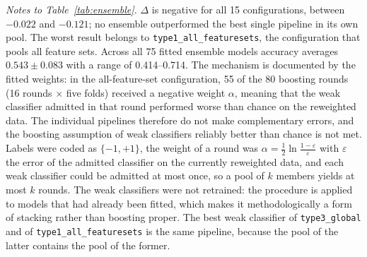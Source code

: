 \begin{table}[htbp]
\centering
\caption{Ensemble analysis: the 15 configurations of discrete, that is binary, AdaBoost \cite{Freund1997} applied to the stored prediction vectors of the 16 patient-level weak classifiers (four patient-level datasets $\times$ four pipelines). Each configuration was fitted on the five outer folds, giving 75 ensemble models. ACC $\varnothing$, mean accuracy of the configuration across the five folds; best weak classifier, the single pipeline in the configuration's pool with the highest mean accuracy, and its value; $\Delta$, the mean accuracy of the ensemble minus that of the best weak classifier. A negative $\Delta$ means the ensemble is worse than the best model it combines. The configuration name states which of the four patient-level datasets form its pool, each contributing all four pipelines: \texttt{type1} pools all four datasets (16 weak classifiers), \texttt{type2} a whole-thrombus dataset with its own centerline counterpart (8), \texttt{type3} a single dataset (4), \texttt{type4} two datasets that are not such a pair (8) and \texttt{type5} all datasets but one (12). \texttt{distrib.}\ abbreviates the distribution-based dataset and \emph{cent.} the centerline region of interest, as in Table~\ref{tab:cv-performance}. The two voxel-based datasets were excluded from every pool because their predictions are defined per voxel.}
\label{tab:ensemble}
\smallskip

\end{table}

\smallskip
{\footnotesize
\sloppy
\noindent
\textit{Notes to Table~\ref{tab:ensemble}.}
$\Delta$ is negative for all 15 configurations, between $-0.022$ and $-0.121$; no ensemble outperformed the best single pipeline in its own pool.
The worst result belongs to \texttt{type1\_\allowbreak all\_\allowbreak featuresets}, the configuration that pools all feature sets.
Across all 75 fitted ensemble models accuracy averages $0.543 \pm 0.083$ with a range of 0.414--0.714.
The mechanism is documented by the fitted weights: in the all-feature-set configuration, 55 of the 80 boosting rounds (16 rounds $\times$ five folds) received a negative weight $\alpha$, meaning that the weak classifier admitted in that round performed worse than chance on the reweighted data.
The individual pipelines therefore do not make complementary errors, and the boosting assumption of weak classifiers reliably better than chance is not met.
Labels were coded as $\{-1,+1\}$, the weight of a round was $\alpha = \tfrac{1}{2}\ln\frac{1-\varepsilon}{\varepsilon}$ with $\varepsilon$ the error of the admitted classifier on the currently reweighted data, and each weak classifier could be admitted at most once, so a pool of $k$ members yields at most $k$ rounds.
The weak classifiers were not retrained: the procedure is applied to models that had already been fitted, which makes it methodologically a form of stacking rather than boosting proper.
The best weak classifier of \texttt{type3\_\allowbreak global} and of \texttt{type1\_\allowbreak all\_\allowbreak featuresets} is the same pipeline, because the pool of the latter contains the pool of the former.
\par}

